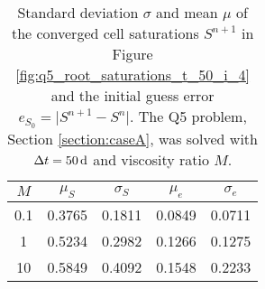 \begin{table}%
\caption{Standard deviation $\sigma$ and mean $\mu$ of the converged cell saturations $S^{n+1}$ in Figure \ref{fig:q5_root_saturations_t_50_i_4} and the initial guess error $e_{S_0} = \lvert S^{n+1} - S^n \rvert$. The Q5 problem, Section \ref{section:caseA}, was solved with $\Delta t = \unit[50]{d}$ and viscosity ratio $M$.}%
\label{table:q5_saturations_statisitcs_t_50_i_180}%
\centering%
\begin{tabular}{ ccc cc }%
\hline
$M$ & $\mu_{S}$ & $\sigma_{S}$ & $\mu_{e}$ & $\sigma_{e}$  \\
\hline
0.1 & 0.3765 & 0.1811 & 0.0849 & 0.0711 \\
1 & 0.5234 & 0.2982 & 0.1266 & 0.1275 \\
10 & 0.5849 & 0.4092 & 0.1548 & 0.2233 \\
\hline
\end{tabular}%
\end{table}%